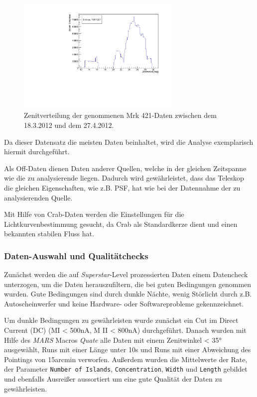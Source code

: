 \begin{figure}
    \centering
    \includegraphics[width=0.7\textwidth]{./Plots/04_MrkAnalyse/Datenset2/Datenset2_Mrk421_MPointingPos_fZd.pdf}
    \caption{Zenitverteilung der genommenen Mrk 421-Daten zwischen dem 18.3.2012 und dem 27.4.2012.}
    \label{Datenset2_fZD}
\end{figure}


Da dieser Datensatz die meisten Daten beinhaltet, wird die Analyse exemplarisch hiermit durchgeführt.

Als Off-Daten dienen Daten anderer Quellen, welche in der gleichen Zeitspanne wie die zu analysierende liegen.
Dadurch wird gewährleistet, dass das Teleskop die gleichen Eigenschaften, wie z.B. PSF, hat wie bei der Datennahme der zu analysierenden Quelle. 

Mit Hilfe von Crab-Daten werden die Einstellungen für die Lichtkurvenbestimmung gesucht, da Crab als Standardkerze dient und einen bekannten stabilen Fluss hat. 


\subsubsection{Daten-Auswahl und Qualitätchecks}
Zunächst werden die auf \textit{Superstar}-Level prozessierten Daten einem Datencheck unterzogen, um die Daten herauszufiltern, die bei guten Bedingungen genommen wurden.
Gute Bedingungen sind durch dunkle Nächte, wenig Störlicht durch z.B. Autoscheinwerfer und keine Hardware- oder Softwareprobleme gekennzeichnet.

Um dunkle Bedingungen zu gewährleisten wurde zunächst ein Cut im Direct Current (DC) (MI < 500nA, M II < 800nA) durchgeführt.
Danach wurden mit Hilfe des \textit{MARS} Macros \textit{Quate} alle Daten mit einem Zenitwinkel < 35° ausgewählt, Runs mit einer Länge unter 10s und Runs mit einer Abweichung des Pointings von 15arcmin verworfen.
Außerdem wurden die Mittelwerte der Rate, der Parameter \texttt{Number of Islands}, \texttt{Concentration}, \texttt{Width} und \texttt{Length} gebildet und ebenfalls Ausreißer aussortiert um eine gute Qualität der Daten zu gewährleisten.

